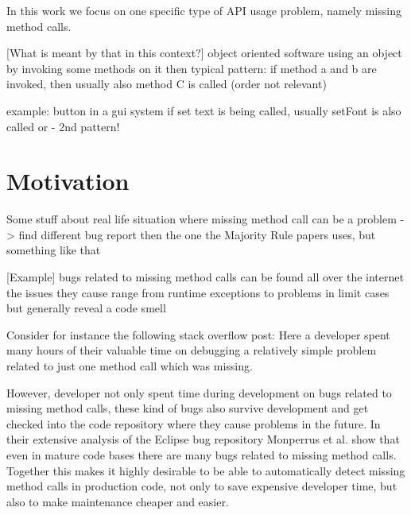 In this work we focus on one specific type of API usage problem, namely missing method calls.

[What is meant by that in this context?]
object oriented software
using an object by invoking some methods on it
then typical pattern: if method a and b are invoked, then usually also method C is called (order not relevant)

example: button in a gui system
if set text is being called, usually setFont is also called
or - 2nd pattern!

\section{Motivation}

Some stuff about real life situation where missing method call can be a problem
-> find different bug report then the one the Majority Rule papers uses, but something like that

[Example]
bugs related to missing method calls can be found all over the internet
the issues they cause range from runtime exceptions to problems in limit cases
but generally reveal a code smell

Consider for instance the following stack overflow post:
Here a developer spent many hours of their valuable time on debugging a relatively simple problem related to just one method call which was missing.

However, developer not only spent time during development on bugs related to missing method calls, these kind of bugs also survive development and get checked into the code repository where they cause problems in the future.
In their extensive analysis of the Eclipse bug repository Monperrus et al. \cite{monperrus2013detecting} show that even in mature code bases there are many bugs related to missing method calls.
Together this makes it highly desirable to be able to automatically detect missing method calls in production code, not only to save expensive developer time, but also to make maintenance cheaper and easier.

